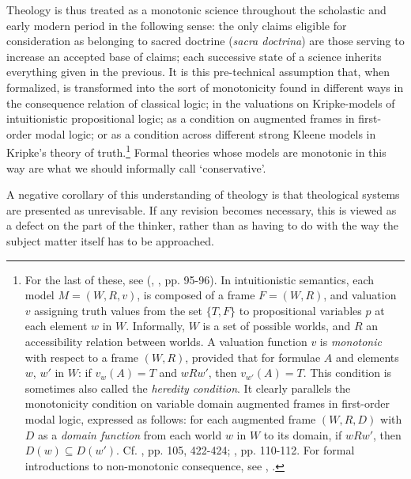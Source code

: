 \documentclass[]{birkjour}
\begin{document}
Theology is thus treated as a monotonic science throughout the scholastic and early modern period in the following sense: the only claims eligible for consideration as belonging to sacred doctrine (\textit{sacra doctrina}) are those serving to increase an accepted base of claims; each successive state of a science inherits everything given in the previous. It is this pre-technical assumption that, when formalized, is transformed into the sort of monotonicity found in different ways in the consequence relation of classical logic; in the valuations on Kripke-models of intuitionistic propositional logic; as a condition on augmented frames in first-order modal logic; or as a condition across different strong Kleene models in Kripke's theory of truth.\footnote{For the last of these, see (\cite{Kripke1975}, \cite{Gupta2001}, pp. 95-96). In intuitionistic semantics, each model $M = (W, R, v) $, is composed of a frame $F = (W, R)$, and valuation $v$ assigning truth values from the set $\{T, F\}$ to propositional variables $p$ at each element $w$ in $W$. Informally, $W$ is a set of possible worlds, and $R$ an accessibility relation between worlds. A valuation function $v$ is \textit{monotonic} with respect to a frame $(W, R)$, provided that for formulae $A$ and elements $w$, $w'$ in $W$: if $v_{w}(A) = T$ and $wRw'$, then $v_{w'}(A) = T$. This condition is sometimes also called the \textit{heredity condition}. It clearly parallels the monotonicity condition on variable domain augmented frames in first-order modal logic, expressed as follows: for each augmented frame $(W, R, D)$ with $D$ as a \textit{domain function} from each world $w$ in $W$ to its domain, if $wRw'$, then $D(w) \subseteq D(w')$. Cf. \cite{Priest2008}, pp. 105, 422-424; \cite{Fitting1998}, pp. 110-112. For formal introductions to  non-monotonic consequence, see \cite{Horty2001}, \cite{Strasser2014}.} Formal theories whose models are monotonic in this way are what we should informally call `conservative'.
	
A negative corollary of this understanding of theology is that theological systems are presented as unrevisable. If any revision becomes necessary, this is viewed as a defect on the part of the thinker, rather than as having to do with the way the subject matter itself has to be approached.
	
\end{document}
